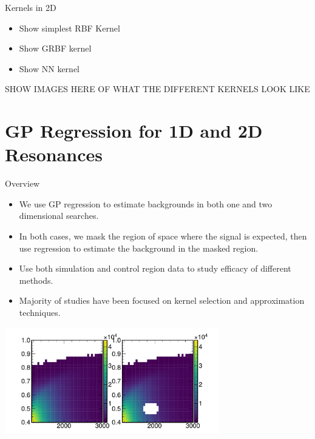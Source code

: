 \documentclass[10pt]{beamer}
\begin{document}
\begin{frame}{Kernels in 2D}
  \begin{itemize}
  \item Show simplest RBF Kernel
  \item Show GRBF kernel
  \item Show NN kernel
  \end{itemize}

  SHOW IMAGES HERE OF WHAT THE DIFFERENT KERNELS LOOK LIKE
\end{frame}

\section[Results]{GP Regression for 1D and 2D Resonances}
\label{sec:results-1d-2d}

\begin{frame}{Overview}
  \begin{itemize}
  \item We use GP regression to estimate backgrounds in both one and two dimensional searches.
  \item In both cases, we mask the region of space where the signal is expected, then use regression to estimate the background in the masked region.
  \item Use both simulation and control region data to study efficacy of different methods. 
  \item Majority of studies have been focused on kernel selection and approximation techniques.
  \end{itemize}

  \begin{center}
    \includegraphics[width=0.7\textwidth]{figures/example_masking}
  \end{center}
\end{frame}
\end{document}
